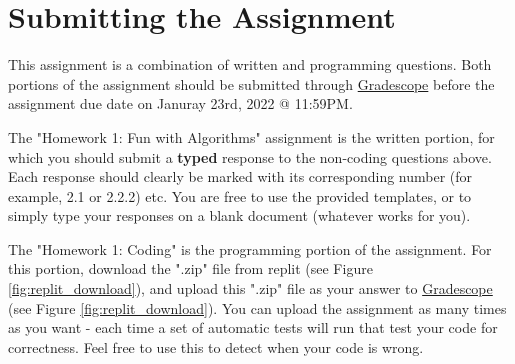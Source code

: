 \documentclass [12pt]{article}
\begin{document}


\pagebreak
\section*{Submitting the Assignment}

This assignment is a combination of written and programming questions. Both portions of the assignment should be submitted through \href{https://www.gradescope.com/courses/350304}{Gradescope} before the assignment due date on Januray 23rd, 2022 @ 11:59PM. 

The "Homework 1: Fun with Algorithms" assignment is the written portion, for which you should submit a \textbf{typed} response to the non-coding questions above. Each response should clearly be marked with its corresponding number (for example, 2.1 or 2.2.2) etc. You are free to use the provided templates, or to simply type your responses on a blank document (whatever works for you).

The "Homework 1: Coding" is the programming portion of the assignment. For this portion, download the ".zip" file from replit (see Figure \ref{fig:replit_download}), and upload this ".zip" file as your answer to \href{https://www.gradescope.com/courses/350304}{Gradescope} (see Figure \ref{fig:replit_download}). You can upload the assignment as many times as you want - each time a set of automatic tests will run that test your code for correctness. Feel free to use this to detect when your code is wrong.
\end{document}
